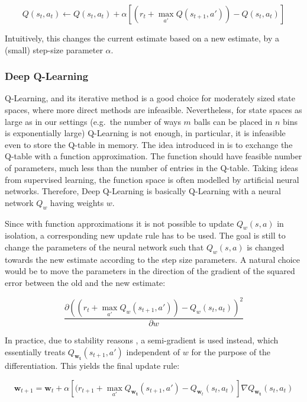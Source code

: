 \begin{equation} \label{eq:q-learningUpdate}
Q(s_t,a_t) \leftarrow Q(s_t,a_t) + \alpha[( r_t + \max_{a'} Q(s_{t+1}, a')) - Q(s_t,a_t)]
\end{equation}


Intuitively, this changes the current estimate based on a new estimate, by a (small) step-size parameter $\alpha$.


\subsubsection{Deep Q-Learning} \label{deepq-learning}


Q-Learning, and its iterative method is a good choice for moderately sized state spaces, where more direct methods are infeasible. Nevertheless, for state spaces as large as in our settings (e.g.\ the number of ways $m$ balls can be placed in $n$ bins is exponentially large) Q-Learning is not enough, in particular, it is infeasible even to store the Q-table in memory. The idea introduced in \cite{mnih2013DQN} is to exchange the Q-table with a function approximation. The function should have feasible number of parameters, much less than the number of entries in the Q-table. Taking ideas from supervised learning, the function space is often modelled by artificial neural networks. Therefore, Deep Q-Learning is basically Q-Learning with a neural network $Q_w$ having weights $w$.

Since with function approximations it is not possible to update $Q_w(s, a)$ in isolation, a corresponding new update rule has to be used. The goal is still to change the parameters of the neural network such that $Q_w(s, a)$ is changed towards the new estimate according to the step size parameters. A natural choice would be to move the parameters in the direction of the gradient of the squared error between the old and the new estimate:

$$\frac{\partial (( r_t + \max_{a'} Q_w(s_{t+1}, a')) - Q_w(s_t,a_t))^2}{\partial w}$$


In practice, due to stability reasons \cite{barnard1993semigradient},  a semi-gradient is used instead, which essentially treats $Q_{\mathbf{w_t}}(s_{t+1}, a')$ independent of $w$ for the purpose of the differentiation. This yields the final update rule:


\begin{equation} \label{eq:deep-q-learning-update-with-semi-gradient}
\mathbf{w}_{t+1} = \mathbf{w}_t + \alpha[( r_{t+1}+ \max_{a'} Q_{\mathbf{w_t}}(s_{t+1}, a') - Q_{\mathbf{w}_t}(s_t,a_t)]\nabla Q_{\mathbf{w_t}}(s_{t}, a_t)
\end{equation}




